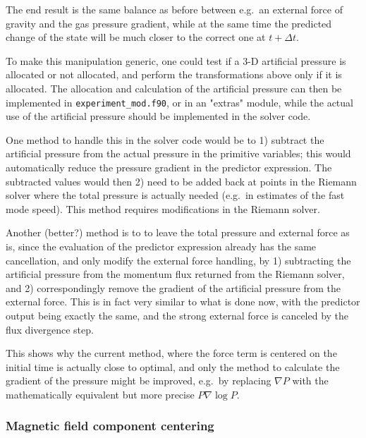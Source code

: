 \documentclass[paper=a4,fontsize=11pt]{scrartcl}
\numberwithin{equation}{section}		%
\numberwithin{figure}{section}			%
\numberwithin{table}{section}				%
\begin{document}
The end result is the same balance as before between e.g.\ an external force of gravity and the gas pressure gradient, while at the same time the predicted change of the state will be much closer to the correct one at $t+\Delta t$.

To make this manipulation generic, one could test if a 3-D artificial pressure is allocated or not allocated, and perform the transformations above only if it is allocated.   The allocation and calculation of the artificial pressure can then be implemented in \verb|experiment_mod.f90|, or in an "extras" module, while the actual use of the artificial pressure should be implemented in the solver code.

One method to handle this in the solver code would be to 1) subtract the artificial pressure from the actual pressure in the primitive variables; this would automatically reduce the pressure gradient in the predictor expression.  The subtracted values would then 2) need to be added back at points in the Riemann solver where the total pressure is actually needed (e.g.\ in estimates of the fast mode speed).  This method requires modifications in the Riemann solver.

Another (better?) method is to to leave the total pressure and external force as is, since the evaluation of the predictor expression already has the same cancellation, and only modify the external force handling, by 1) subtracting the artificial pressure from the momentum flux returned from the Riemann solver, and 2) correspondingly remove the gradient of the artificial pressure from the external force.  This is in fact very similar to what is done now, with the predictor output being exactly the same, and the strong external force is canceled by the flux divergence step.

This shows why the current method, where the force term is centered on the initial time is actually close to optimal, and only the method to calculate the gradient of the pressure might be improved, e.g.\ by replacing $\nabla P$ with the mathematically equivalent but more precise $P\nabla\log P$.

\subsubsection{Magnetic field component centering}
\end{document}
